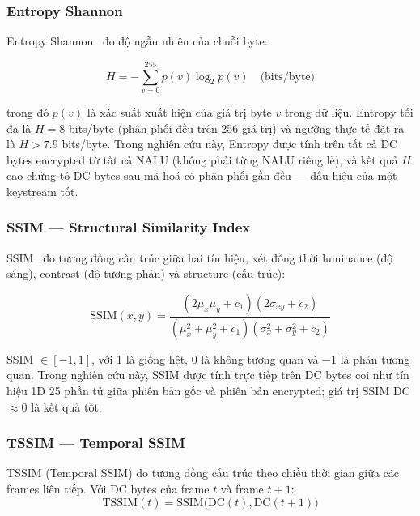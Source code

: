 \subsubsection{Entropy Shannon}

Entropy Shannon~\cite{shannon1949} đo độ ngẫu nhiên của chuỗi byte:

\begin{equation}
H = -\sum_{v=0}^{255} p(v) \log_2 p(v) \quad \text{(bits/byte)}
\label{eq:entropy}
\end{equation}

trong đó $p(v)$ là xác suất xuất hiện của giá trị byte $v$ trong dữ liệu. Entropy tối đa là $H = 8$ bits/byte (phân phối đều trên 256 giá trị) và ngưỡng thực tế đặt ra là $H > 7.9$ bits/byte. Trong nghiên cứu này, Entropy được tính trên tất cả DC bytes encrypted từ tất cả NALU (không phải từng NALU riêng lẻ), và kết quả $H$ cao chứng tỏ DC bytes sau mã hoá có phân phối gần đều --- dấu hiệu của một keystream tốt.

\subsubsection{SSIM --- Structural Similarity Index}

SSIM~\cite{wang_ssim} đo tương đồng cấu trúc giữa hai tín hiệu, xét đồng thời luminance (độ sáng), contrast (độ tương phản) và structure (cấu trúc):

\begin{equation}
\text{SSIM}(x, y) = \frac{(2\mu_x\mu_y + c_1)(2\sigma_{xy} + c_2)}{(\mu_x^2 + \mu_y^2 + c_1)(\sigma_x^2 + \sigma_y^2 + c_2)}
\end{equation}

SSIM $\in [-1, 1]$, với 1 là giống hệt, 0 là không tương quan và $-1$ là phản tương quan. Trong nghiên cứu này, SSIM được tính trực tiếp trên DC bytes coi như tín hiệu 1D 25 phần tử giữa phiên bản gốc và phiên bản encrypted; giá trị SSIM DC $\approx 0$ là kết quả tốt.

\subsubsection{TSSIM --- Temporal SSIM}

TSSIM (Temporal SSIM) đo tương đồng cấu trúc theo chiều thời gian giữa các frames liên tiếp. Với DC bytes của frame $t$ và frame $t+1$:
\begin{equation}
\text{TSSIM}(t) = \text{SSIM}\bigl(\text{DC}(t), \text{DC}(t+1)\bigr)
\end{equation}

